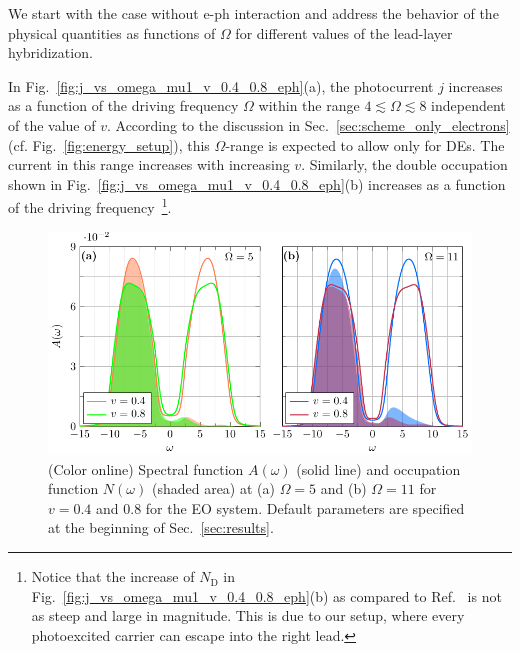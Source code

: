 \documentclass[aps,prb,groupedaddress,showpacs,twocolumn,superscriptaddress,10pt]{revtex4-2}
\begin{document}
We start with the case without e-ph interaction and address the behavior of the physical quantities as functions of $\Omega$ for different values of the lead-layer hybridization.

In Fig.~\ref{fig:j_vs_omega_mu1_v_0.4_0.8_eph}(a), the photocurrent $j$ increases as a function of the driving frequency $\Omega$ within the range $4\lesssim\Omega\lesssim8$ independent of the value of $v$. According to the discussion in Sec.~\ref{sec:scheme_only_electrons} (cf.  Fig.~\ref{fig:energy_setup}), this $\Omega$-range is expected to allow only for DEs. The current in this range  increases with increasing $v$. Similarly, the double occupation shown in Fig.~\ref{fig:j_vs_omega_mu1_v_0.4_0.8_eph}(b) increases as a function of the driving frequency~\footnote{Notice that the increase of $N_{\text{D}}$ in Fig.~\ref{fig:j_vs_omega_mu1_v_0.4_0.8_eph}(b) as compared to Ref.~\cite{so.do.18} is not as steep and large in magnitude. This is due to our setup, where every photoexcited carrier can escape into the right lead.}.

\begin{figure}[b] 
\includegraphics[width=\linewidth]{./figures_Paper1/spec_filling_mu1_v_0.4_0.8_O_5_11_e.pdf}
\caption{(Color online) Spectral function $A(\omega)$ (solid line) and occupation function $N(\omega)$ (shaded area) at (a) $\Omega=5$ and (b) $\Omega=11$ for $v=0.4$ and $0.8$ for the EO system. Default parameters are specified at the beginning of Sec.~\ref{sec:results}.}
\label{fig:spec_filling_mu1_v_0.4_0.8_O_5_11_e}
\end{figure} 
\end{document}
